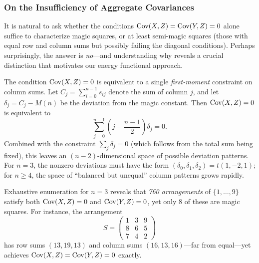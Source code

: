 \subsubsection{On the Insufficiency of Aggregate Covariances}
\label{sec:insufficiency}

It is natural to ask whether the conditions $\mathrm{Cov}(X, Z) = \mathrm{Cov}(Y, Z) = 0$ alone 
suffice to characterize magic squares, or at least semi-magic squares 
(those with equal row and column sums but possibly failing the diagonal conditions).
Perhaps surprisingly, the answer is \emph{no}---and understanding why reveals 
a crucial distinction that motivates our energy functional approach.

\begin{remark}[Why $\Cov(X,Z)=0$ Is Not Enough]
\label{rem:first_moment}
The condition $\Cov(X, Z) = 0$ is equivalent to a single \emph{first-moment} constraint on column sums.
Let $C_j = \sum_{i=0}^{n-1} s_{ij}$ denote the sum of column $j$, and let $\delta_j = C_j - M(n)$ 
be the deviation from the magic constant. Then $\Cov(X, Z) = 0$ is equivalent to
\[
\sum_{j=0}^{n-1} \left( j - \frac{n-1}{2} \right) \delta_j = 0.
\]
Combined with the constraint $\sum_j \delta_j = 0$ (which follows from the total sum being fixed),
this leaves an $(n-2)$-dimensional space of possible deviation patterns.
For $n = 3$, the nonzero deviations must have the form $(\delta_0, \delta_1, \delta_2) = t(1, -2, 1)$;
for $n \geq 4$, the space of ``balanced but unequal'' column patterns grows rapidly.
\end{remark}

\begin{remark}[Counterexamples Exist for $n = 3$]
\label{rem:counterexample}
Exhaustive enumeration for $n = 3$ reveals that \emph{760 arrangements} of $\{1, \ldots, 9\}$ 
satisfy both $\Cov(X, Z) = 0$ and $\mathrm{Cov}(Y, Z) = 0$, yet only 8 of these are magic squares.
For instance, the arrangement
\[
S = \begin{pmatrix}
1 & 3 & 9 \\
8 & 6 & 5 \\
7 & 4 & 2
\end{pmatrix}
\]
has row sums $(13, 19, 13)$ and column sums $(16, 13, 16)$---far from equal---yet 
achieves $\mathrm{Cov}(X, Z) = \mathrm{Cov}(Y, Z) = 0$ exactly.
\end{remark}

